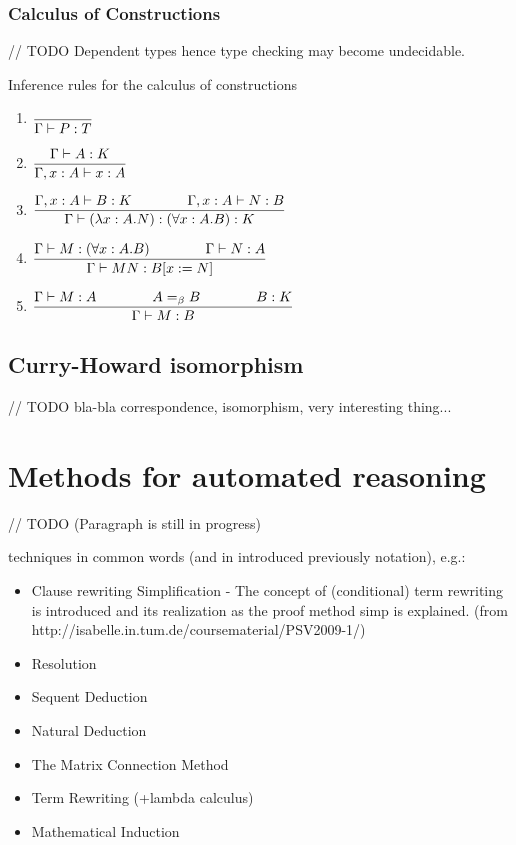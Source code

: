 \documentclass[article]{aaltoseries}
\begin{document}
\subsubsection{Calculus of Constructions}
// TODO
Dependent types
hence type checking may become undecidable.

Inference rules for the calculus of constructions
\begin{enumerate}
	\item ${\displaystyle {{} \over {}\Gamma \vdash P:T}}$
	\item ${\displaystyle {\Gamma \vdash A:K \over {\Gamma ,x:A\vdash x:A}}}$ %
	\item ${\displaystyle {\Gamma ,x:A\vdash B:K\qquad \qquad \Gamma ,x:A\vdash N:B \over {\Gamma \vdash (\lambda x:A.N):(\forall x:A.B):K}}}$
	\item ${\displaystyle {\Gamma \vdash M:(\forall x:A.B)\qquad \qquad \Gamma \vdash N:A \over {\Gamma \vdash MN:B[x:=N]}}}$
	\item ${\displaystyle {\Gamma \vdash M:A\qquad \qquad A=_{\beta }B\qquad \qquad B:K \over {\Gamma \vdash M:B}}}$ %
\end{enumerate}





\subsection{Curry-Howard isomorphism}
// TODO
bla-bla correspondence, isomorphism, very interesting thing...


\section{Methods for automated reasoning}
\label{sec:auto_reasoning}

// TODO (Paragraph is still in progress)

techniques in common words (and in introduced previously notation), e.g.: 
\begin{itemize}
\itemsep0em
	\item Clause rewriting
		Simplification - The concept of (conditional) term rewriting is introduced and its realization as the proof method simp is explained. (from http://isabelle.in.tum.de/coursematerial/PSV2009-1/)
		
	\item Resolution
	\item Sequent Deduction
	\item Natural Deduction
	\item The Matrix Connection Method
	\item Term Rewriting (+lambda calculus)
	\item Mathematical Induction
\end{itemize}
\end{document}
